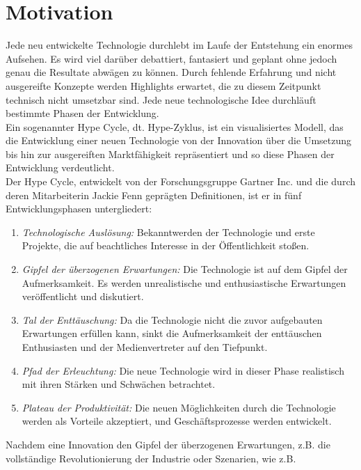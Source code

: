 \section{Motivation}
\label{chap:Motivation}
Jede neu entwickelte Technologie durchlebt im Laufe der Entstehung ein enormes Aufsehen. Es wird viel darüber debattiert, fantasiert 
und geplant ohne jedoch genau die Resultate abwägen zu können. Durch fehlende Erfahrung und nicht ausgereifte Konzepte werden Highlights 
erwartet, die zu diesem Zeitpunkt technisch nicht umsetzbar sind. Jede neue technologische Idee durchläuft bestimmte Phasen der Entwicklung.
\cite{studiob12.2020j} 
\\ 
\linebreak
Ein sogenannter Hype Cycle, dt. Hype-Zyklus, ist ein visualisiertes Modell, das die Entwicklung einer neuen Technologie von der 
Innovation über die Umsetzung bis hin zur ausgereiften Marktfähigkeit repräsentiert und so diese Phasen der Entwicklung verdeutlicht.
\\
Der Hype Cycle, entwickelt von der Forschungsgruppe Gartner Inc. und die durch deren Mitarbeiterin Jackie Fenn geprägten Definitionen, ist er 
in fünf Entwicklungsphasen untergliedert:
\begin{enumerate}
    \item \textit{Technologische Auslösung:} Bekanntwerden der Technologie und erste Projekte, die auf beachtliches Interesse in der 
    Öffentlichkeit stoßen. 
    \item \textit{Gipfel der überzogenen Erwartungen:} Die Technologie ist auf dem Gipfel der Aufmerksamkeit. Es werden unrealistische 
    und enthusiastische Erwartungen veröffentlicht und diskutiert.
    \item \textit{Tal der Enttäuschung:} Da die Technologie nicht die zuvor aufgebauten Erwartungen erfüllen kann, sinkt die Aufmerksamkeit 
    der enttäuschen Enthusiasten und der Medienvertreter auf den Tiefpunkt.
    \item \textit{Pfad der Erleuchtung:} Die neue Technologie wird in dieser Phase realistisch mit ihren Stärken und Schwächen betrachtet.
    \item \textit{Plateau der Produktivität:} Die neuen Möglichkeiten durch die Technologie werden als Vorteile akzeptiert, und 
    Geschäftsprozesse werden entwickelt. \cite{gartnerhc.2016s}
\end{enumerate} 
Nachdem eine Innovation den Gipfel der überzogenen Erwartungen, z.B. die vollständige Revolutionierung der Industrie oder Szenarien, wie z.B. 
